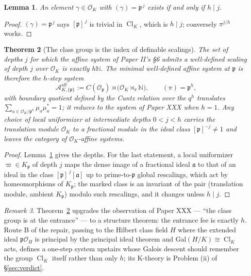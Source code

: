 \documentclass[11pt]{amsart}
\newtheorem{theorem}{Theorem}[section]
\newtheorem{lemma}[theorem]{Lemma}
\theoremstyle{remark}
\newtheorem{remark}[theorem]{Remark}
\newcommand{\OK}{\mathcal{O}_K}
\newcommand{\Op}{\mathcal{O}_\pp}
\newcommand{\pp}{\mathfrak{p}}
\newcommand{\N}{\mathbb{N}}
\newcommand{\Cl}{\operatorname{Cl}}
\newcommand{\Aaff}{\mathcal{A}^{\mathrm{aff}}}
\begin{document}
\begin{lemma}\label{lem:exist}
An element $\gamma\in\OK$ with $(\gamma)=\pp^{\,j}$ exists if and only if $h\mid j$.
\end{lemma}

\begin{proof}
$(\gamma)=\pp^{\,j}$ says $[\pp]^{\,j}$ is trivial in $\Cl_K$, which is $h\mid j$;
conversely $\pi^{j/h}$ works.
\end{proof}

\begin{theorem}[The class group is the index of definable scalings]\label{thm:index}
The set of depths $j$ for which the affine system of Paper II's \S6 admits a well-defined
scaling of depth $j$ over $\OK$ is exactly $h\N$. The minimal well-defined affine system
at $\pp$ is therefore the $h$-step system
\[
\Aaff_{K,\{\pp\}}:=C(\Op)\rtimes\bigl(\OK\rtimes_\pi\N\bigr),\qquad(\pi)=\pp^{h},
\]
with boundary quotient defined by the Cuntz relation over the $q^h$ translates
$\sum_{a\in\OK/\pp^{h}}\mu_a\mu_a^*=1$; it reduces to the system of Paper XXX when $h=1$.
Any choice of local uniformizer at intermediate depths $0<j<h$ carries the translation
module $\OK$ to a fractional module in the ideal class $[\pp]^{-j}\ne1$ and leaves the
category of $\OK$-affine systems.
\end{theorem}

\begin{proof}
Lemma~\ref{lem:exist} gives the depths. For the last statement, a local uniformizer
$\varpi\in K_\pp$ of depth $j$ maps the dense image of a fractional ideal $\mathfrak a$ to
that of an ideal in the class $[\pp]^{\,j}[\mathfrak a]$ up to prime-to-$\pp$ global
rescalings, which act by homeomorphisms of $K_\pp$; the marked class is an invariant of
the pair (translation module, ambient $K_\pp$) modulo such rescalings, and it changes
unless $h\mid j$.
\end{proof}

\begin{remark}
Theorem~\ref{thm:index} upgrades the observation of Paper XXX --- ``the class group is at
the entrance'' --- to a structure theorem: the entrance fee is exactly $h$. Route B of the
repair, passing to the Hilbert class field $H$ where the extended ideal $\pp\mathcal O_H$
is principal by the principal ideal theorem \cite[VI.7]{Neukirch} and
$\mathrm{Gal}(H/K)\cong\Cl_K$ acts, defines a one-step system upstairs whose Galois
descent should remember the group $\Cl_K$ itself rather than only $h$; its K-theory is
Problem (ii) of \S\ref{sec:verdict}.
\end{remark}
\end{document}
